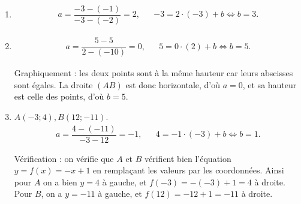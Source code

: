 {\begin{enumerate}
		\item
		\begin{align*}
			a = \dfrac{-3-(-1)}{-3-(-2)} = 2, && -3 = 2\cdot(-3) + b \iff b=3.
		\end{align*}
			
		\item
		\begin{align*}
			a = \dfrac{5-5}{2-(-10)} = 0, && 5 = 0\cdot(2) + b \iff b=5.
		\end{align*}
		
		Graphiquement : les deux points sont à la même hauteur car leurs abscisses sont égales.
		La droite $(AB)$ est donc horizontale, d'où $a=0$, et sa hauteur est celle des points, d'où $b=5$.
			
		\item $A(-3;4), B(12;-11)$.
		\begin{align*}
			a = \dfrac{4-(-11)}{-3-12} = -1, && 4 = -1\cdot(-3) + b \iff b = 1.
		\end{align*}
		
		Vérification : on vérifie que $A$ et $B$ vérifient bien l'équation $y=f(x) = -x +1$ en remplaçant les valeurs par les coordonnées.
		Ainsi pour $A$ on a bien $y=4$ à gauche, et $f(-3) = -(-3) + 1 = 4$ à droite.
		Pour $B$, on a $y=-11$ à gauche, et $f(12) = -12 + 1 = -11$ à droite.
	\end{enumerate}
}



